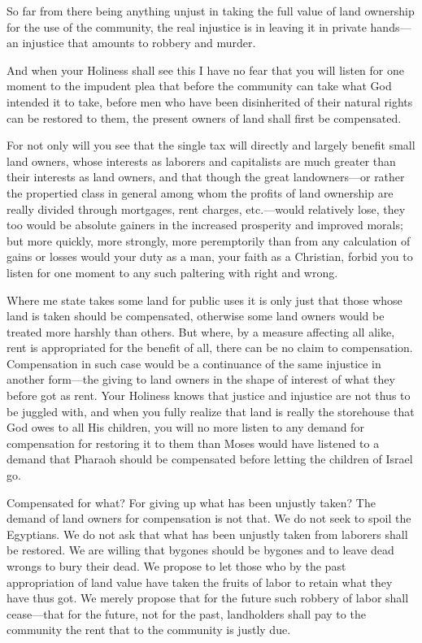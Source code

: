 \documentclass{book}
\begin{document}
So far from there being anything unjust in taking the full value of land ownership for the use of the community, the real injustice is in leaving it in private hands—an injustice that amounts to robbery and murder.

And when your Holiness shall see this I have no fear that you will listen for one moment to the impudent plea that before the community can take what God intended it to take, before men who have been disinherited of their natural rights can be restored to them, the present owners of land shall first be compensated.

For not only will you see that the single tax will directly and largely benefit small land owners, whose interests as laborers and capitalists are much greater than their interests as land owners, and that though the great landowners—or rather the propertied class in general among whom the profits of land ownership are really divided through mortgages, rent charges, etc.—would relatively lose, they too would be absolute gainers in the increased prosperity and improved morals; but more quickly, more strongly, more peremptorily than from any calculation of gains or losses would your duty as a man, your faith as a Christian, forbid you to listen for one moment to any such paltering with right and wrong.

Where me state takes some land for public uses it is only just that those whose land is taken should be compensated, otherwise some land owners would be treated more harshly than others. But where, by a measure affecting all alike, rent is appropriated for the benefit of all, there can be no claim to compensation. Compensation in such case would be a continuance of the same injustice in another form—the giving to land owners in the shape of interest of what they before got as rent. Your Holiness knows that justice and injustice are not thus to be juggled with, and when you fully realize that land is really the storehouse that God owes to all His children, you will no more listen to any demand for compensation for restoring it to them than Moses would have listened to a demand that Pharaoh should be compensated before letting the children of Israel go.

Compensated for what? For giving up what has been unjustly taken? The demand of land owners for compensation is not that. We do not seek to spoil the Egyptians. We do not ask that what has been unjustly taken from laborers shall be restored. We are willing that bygones should be bygones and to leave dead wrongs to bury their dead. We propose to let those who by the past appropriation of land value have taken the fruits of labor to retain what they have thus got. We merely propose that for the future such robbery of labor shall cease—that for the future, not for the past, landholders shall pay to the community the rent that to the community is justly due.
\end{document}
